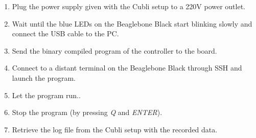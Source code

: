 \begin{enumerate}
  \item Plug the power supply given with the Cubli setup to a \si{220}{V} power outlet.
  \item Wait until the blue LEDs on the Beaglebone Black start blinking slowly and connect the USB cable to the PC.
  \item Send the binary compiled program of the controller to the board.
  \item Connect to a distant terminal on the Beaglebone Black through SSH and launch the program.
  \item Let the program run..
  \item Stop the program (by pressing \textit{Q} and \textit{ENTER}).
  \item Retrieve the log file from the Cubli setup with the recorded data.
\end{enumerate}

